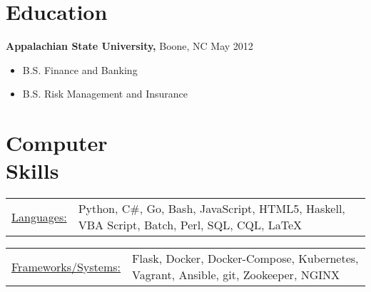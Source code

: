 \documentclass{res}
\begin{document}
\begin{resume}
    
\section{Education} 
  {\bf Appalachian State University,} Boone, NC \hfill May 2012
    \begin{itemize} \itemsep -2pt
      \item B.S. Finance and Banking
      \item B.S. Risk Management and Insurance
    \end{itemize}

\section{Computer \\ Skills}
   \begin{tabular}{l p{5in}}
    \underline{Languages:} & \raggedright Python, C\#, Go, Bash, JavaScript, HTML5, Haskell, VBA Script, Batch, Perl, SQL, CQL, \LaTeX\\
   \end{tabular}
   \begin{tabular}{l p{5in}}
    \underline{Frameworks/Systems:} & \raggedright Flask, Docker, Docker-Compose, Kubernetes, Vagrant, Ansible, git, Zookeeper, NGINX
 \end{tabular}
\end{resume} 
\end{document}
